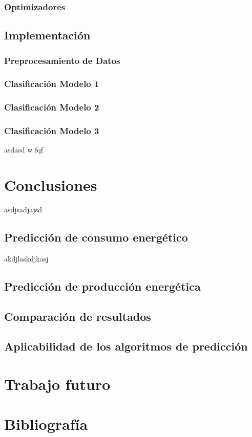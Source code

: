\documentclass[a4paper,12pt]{article}
\begin{document}
\subsubsection{Optimizadores}

\subsection{Implementación}

\subsubsection{Preprocesamiento de Datos}

\subsubsection{Clasificación Modelo 1}

\subsubsection{Clasificación Modelo 2}

\subsubsection{Clasificación Modelo 3}

asdasd w fqf

\section{Conclusiones}
asdjsadjajsd

\subsection{Predicción de consumo energético}
akdjlaskdjkasj

\subsection{Predicción de producción energética}

\subsection{Comparación de resultados}

\subsection{Aplicabilidad de los algoritmos de predicción}

\section{Trabajo futuro}

\section*{Bibliografía}

\printbibliography
\end{document}
